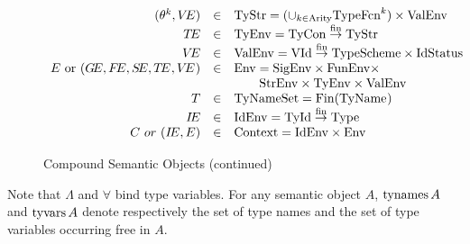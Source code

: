 \begin{figure}[h]
\begin{displaymath}
\begin{array}{rcl}
(\typefnc[\k],\VE)    & \in   & \TyStr = (\cup_{\k\in\Arity}\TypeFnc[\k])\times\ValEnv\\

\TE		& \in	& \TyEnv = \finfun{\TyCon}{\TyStr}\\
\VE		& \in	& \ValEnv = \finfun{\VId}{\TypeScheme\times\IdStatus}\\ %
 \E\ {\rm or}\ \longenv
                 & \in	& \Env = \SigEnv\times\FunEnv\times \\
                 &      & \qquad \StrEnv\times\TyEnv\times\ValEnv \\
\T              & \in   & \TyNameSets = \Fin(\TyName)\\
\IE              & \in   & \IdEnv = \finfun{\TyId}{\Type}\\
\C\ or\ \longcontext   & \in   & \Context =\IdEnv\times\Env
\end{array}
\end{displaymath}
\caption{Compound Semantic Objects (continued)}
\label{compound-objects-continued}
\end{figure}

% 
Note that $\Lambda$ and $\forall$ bind type variables.  For any semantic object
$A$, $\mathop{\rm tynames}\nolimits A$ and $\mathop{\rm tyvars}\nolimits A$ denote respectively the set of
type names and the set of type variables occurring free in $A$.

